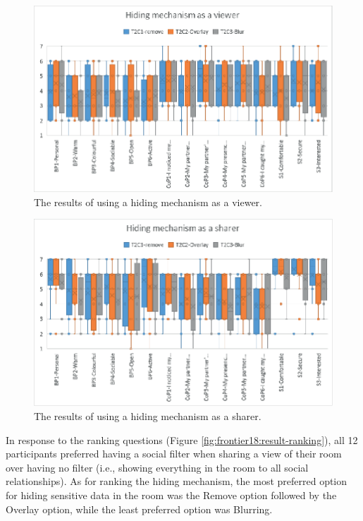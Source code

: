 \begin{figure}
\begin{center}
\includegraphics[width=0.9\linewidth]{images/frontier18/images-05.eps}
\caption{The results of using a hiding mechanism as a viewer.}\label{fig:frontier18:result-hiding-viewer}
\end{center}
\end{figure}

\begin{figure}
\begin{center}
\includegraphics[width=0.9\linewidth]{images/frontier18/images-06.eps}
\caption{The results of using a hiding mechanism as a sharer.}\label{fig:frontier18:result-hiding-sharer}
\end{center}
\end{figure}

In response to the ranking questions (Figure \ref{fig:frontier18:result-ranking}), all 12 participants preferred having a social filter when sharing a view of their room over having no filter (i.e., showing everything in the room to all social relationships). As for ranking the hiding mechanism, the most preferred option for hiding sensitive data in the room was the Remove option followed by the Overlay option, while the least preferred option was Blurring. 

